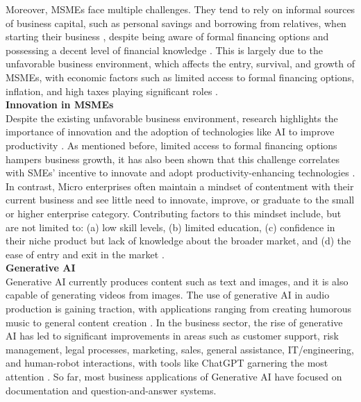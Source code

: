 \documentclass{article}
\begin{document}

Moreover, MSMEs face multiple challenges. They tend to rely on informal sources of business capital, such as personal savings and borrowing from relatives, when starting their business \parencite{almeda_micro_2012}, despite being aware of formal financing options and possessing a decent level of financial knowledge \parencite{ibarra_accounting_2015}. This is largely due to the unfavorable business environment, which affects the entry, survival, and growth of MSMEs, with economic factors such as limited access to formal financing options, inflation, and high taxes playing significant roles \parencite{duran_common_2024} \parencite{senate_economic_planning_office_msme_2012}. \\ 


\textbf{Innovation in MSMEs} \\
Despite the existing unfavorable business environment, research highlights the importance of innovation and the adoption of technologies like AI to improve productivity \parencite{duran_common_2024}. As mentioned before, limited access to formal financing options hampers business growth, it has also been shown that this challenge correlates with SMEs' incentive to innovate and adopt productivity-enhancing technologies \parencite{lim_innovation_2022}. In contrast, Micro enterprises often maintain a mindset of contentment with their current business and see little need to innovate, improve, or graduate to the small or higher enterprise category. Contributing factors to this mindset include, but are not limited to: (a) low skill levels, (b) limited education, (c) confidence in their niche product but lack of knowledge about the broader market, and (d) the ease of entry and exit in the market \parencite{rahmawati_analysis_2015}.\\ 



\textbf{Generative AI} \\
Generative AI currently produces content such as text and images, and it is also capable of generating videos from images. The use of generative AI in audio production is gaining traction, with applications ranging from creating humorous music to general content creation \parencite{dong_generative_2024} \parencite{chui_generative_2022}. In the business sector, the rise of generative AI has led to significant improvements in areas such as customer support, risk management, legal processes, marketing, sales, general assistance, IT/engineering, and human-robot interactions, with tools like ChatGPT garnering the most attention \parencite{chui_generative_2022} \parencite{brynjolfsson_generative_2023}. So far, most business applications of Generative AI have focused on documentation and question-and-answer systems. \\
\end{document}
